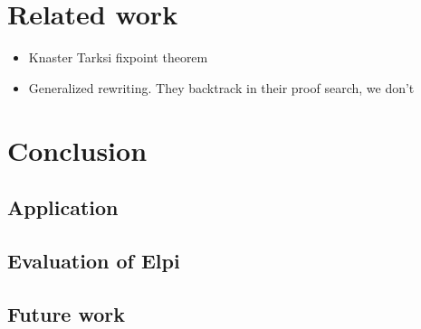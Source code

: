 \documentclass[11pt,a4paper]{report}
\begin{document}


\tableofcontents






% 


\chapter{Related work} \label{ch:relatedwork}
\begin{itemize}
    \item Knaster Tarksi fixpoint theorem
    \item Generalized rewriting. They backtrack in their proof search, we don't
\end{itemize}

\chapter{Conclusion}
\section{Application}
\section{Evaluation of Elpi}
\section{Future work}

\printbibliography

\newpage
\mbox{}
\thispagestyle{empty}
\newpage
\mbox{}
\thispagestyle{empty}
\end{document}
